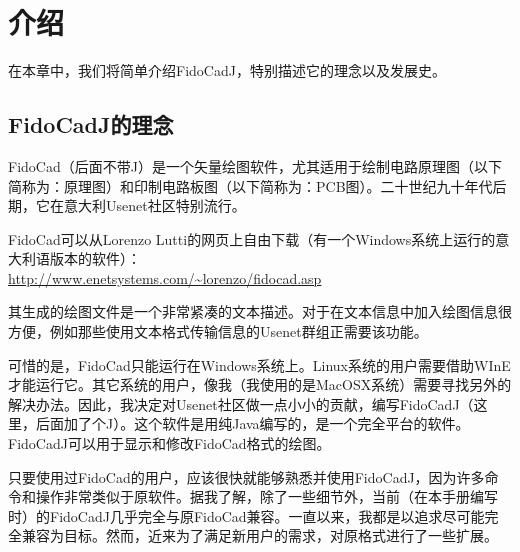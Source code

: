 \documentclass[10pt,a4paper,twoside]{scrreprt}
\begin{document}
\clearpage{}
\tableofcontents {}

\clearpage{}
\listoffigures



\clearpage{}
\listoftables


\chapter{介绍}


在本章中，我们将简单介绍FidoCadJ，特别描述它的理念以及发展史。

\section{FidoCadJ的理念}

FidoCad（后面不带J）是一个矢量绘图软件，尤其适用于绘制电路原理图（以下简称为：原理图）和印制电路板图（以下简称为：PCB图）。二十世纪九十年代后期，它在意大利Usenet社区特别流行。

FidoCad可以从Lorenzo Lutti的网页上自由下载（有一个Windows系统上运行的意大利语版本的软件）：\\ \href{http://www.enetsystems.com/~lorenzo/fidocad.asp}{http://www.enetsystems.com/\textasciitilde lorenzo/fidocad.asp}

其生成的绘图文件是一个非常紧凑的文本描述。对于在文本信息中加入绘图信息很方便，例如那些使用文本格式传输信息的Usenet群组正需要该功能。

可惜的是，FidoCad只能运行在Windows系统上。Linux系统的用户需要借助WInE才能运行它。其它系统的用户，像我（我使用的是MacOSX系统）需要寻找另外的解决办法。因此，我决定对Usenet社区做一点小小的贡献，编写FidoCadJ（这里，后面加了个J）。这个软件是用纯Java编写的，是一个完全平台的软件。FidoCadJ可以用于显示和修改FidoCad格式的绘图。

只要使用过FidoCad的用户，应该很快就能够熟悉并使用FidoCadJ，因为许多命令和操作非常类似于原软件。据我了解，除了一些细节外，当前（在本手册编写时）的FidoCadJ几乎完全与原FidoCad兼容。一直以来，我都是以追求尽可能完全兼容为目标。然而，近来为了满足新用户的需求，对原格式进行了一些扩展。
\end{document}
